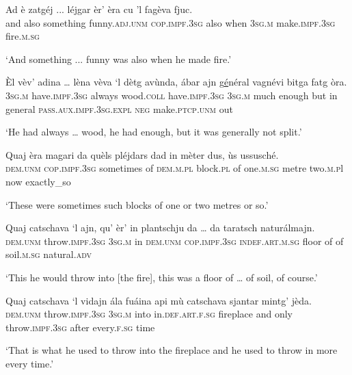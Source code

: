 \begin{linenumbers}
\gll  Ad è zatgéj ... léjgar èr’ èra cu ’l fagèva fjuc.  \\
 and also something {} funny.\textsc{adj.unm} \textsc{cop.impf.3sg} also when \textsc{3sg.m} make.\textsc{impf.3sg} fire.\textsc{m.sg} \\
\end{linenumbers}
\medskip
\glt `And something ... funny was also when he made fire.'
\medskip

\begin{linenumbers}
\gll Èl vèv’ adina … lèna vèva `l dètg avùnda, ábar ajn g\underline{é}néral vagnévi bitga fatg òra. \\
 \textsc{3sg.m} have.\textsc{impf.3sg} always {} wood.\textsc{coll} have.\textsc{impf.3sg} \textsc{3sg.m} much enough but in general \textsc{pass.aux.impf.3sg.expl} \textsc{neg} make.\textsc{ptcp.unm} out  \\
\end{linenumbers}
\medskip
\glt `He had always … wood, he  had enough, but it was generally not split.'
\medskip

\begin{linenumbers}
\gll  Quaj èra magari da quèls pléjdars dad in mèter dus, ùs ussusché. \\
 \textsc{dem.unm} \textsc{cop.impf.3sg} sometimes of \textsc{dem.m.pl} block.\textsc{pl} of one.\textsc{m.sg} metre two.\textsc{m.p}l now exactly\_so  \\
\end{linenumbers}
\medskip
\glt `These were sometimes such blocks of one or two metres or so.'
\medskip

\begin{linenumbers}
\gll Quaj catschava `l ajn, qu’ èr’ in plantschju da … da taratsch naturálmajn.\\
 \textsc{dem.unm} throw.\textsc{impf.3sg} \textsc{3sg.m} in \textsc{dem.unm} \textsc{cop.impf.3sg} \textsc{indef.art.m.sg} floor of {} of soil.\textsc{m.sg} natural.\textsc{adv}\\
\end{linenumbers}
\medskip
\glt `This he would throw into [the fire], this was a floor of … of soil, of course.'
\medskip

\begin{linenumbers}
\gll Quaj catschava `l vidajn ála fuáina api mù catschava sjantar mintg’ jèda.\\
 \textsc{dem.unm} throw.\textsc{impf.3sg} \textsc{3sg.m} into in.\textsc{def.art.f.sg} fireplace and only throw.\textsc{impf.3sg} after every.\textsc{f.sg} time\\
\end{linenumbers}
\medskip
\glt `That is what he used to throw into the fireplace and he used to throw in more every time.'
\medskip
 
